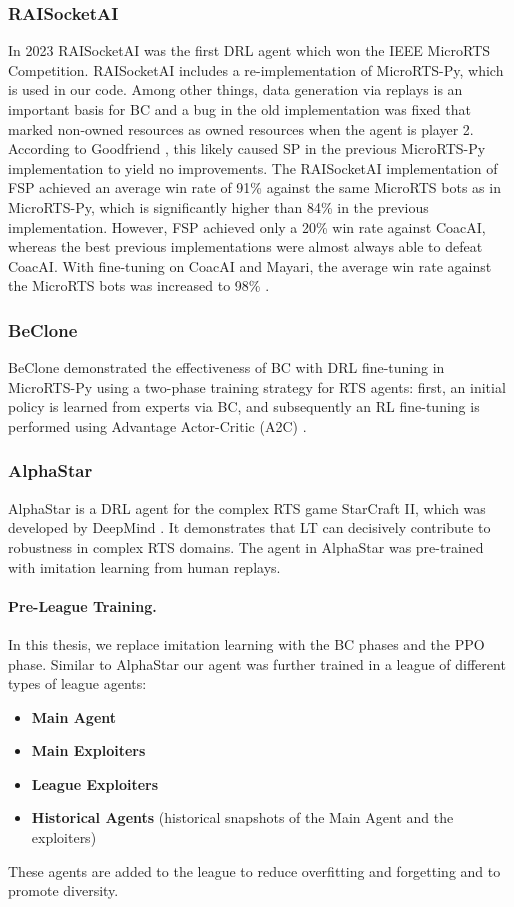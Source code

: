 \documentclass[10pt,twocolumn,letterpaper]{article}
\begin{document}
\subsubsection{RAISocketAI}
In 2023 RAISocketAI was the first DRL agent which won the IEEE MicroRTS Competition. 
RAISocketAI includes a re-implementation of MicroRTS-Py, which is used in our code. 
Among other things, data generation via replays is an important basis for BC \cite{huft2023microrts} and a bug in the old implementation was fixed that marked non-owned resources as owned resources when the agent is player 2. 
According to Goodfriend \cite{goodfriend2024raisocketai}, this likely caused SP in the previous MicroRTS-Py implementation to yield no improvements.
The RAISocketAI implementation of FSP achieved an average win rate of 91\% against the same MicroRTS bots as in MicroRTS-Py, which is significantly higher than 84\% in the previous implementation. 
However, FSP achieved only a 20\% win rate against CoacAI, whereas the best previous implementations were almost always able to defeat CoacAI. 
With fine-tuning on CoacAI and Mayari, the average win rate against the MicroRTS bots was increased to 98\% \cite{goodfriend2024raisocketai}.

\subsubsection{BeClone}
BeClone demonstrated the effectiveness of BC with DRL fine-tuning in MicroRTS-Py using a two-phase training strategy for RTS agents: first, an initial policy is learned from experts via BC, and subsequently an RL fine-tuning is performed using Advantage Actor-Critic (A2C) \cite{martin2021beclone}.

\subsubsection{AlphaStar}
AlphaStar is a DRL agent for the complex RTS game StarCraft II, which was developed by DeepMind \cite{vinyals2019alphastar}.
It demonstrates that LT can decisively contribute to robustness in complex RTS domains. 
The agent in AlphaStar was pre-trained with imitation learning from human replays. 

\paragraph{Pre-League Training.}
In this thesis, we replace imitation learning with the BC phases and the PPO phase. 
Similar to AlphaStar our agent was further trained in a league of different types of league agents:
\begin{itemize}
    \item \textbf{Main Agent}
    \item \textbf{Main Exploiters}
    \item \textbf{League Exploiters}
    \item \textbf{Historical Agents} (historical snapshots of the Main Agent and the exploiters)
\end{itemize}
These agents are added to the league to reduce overfitting and forgetting and to promote diversity.
\end{document}
